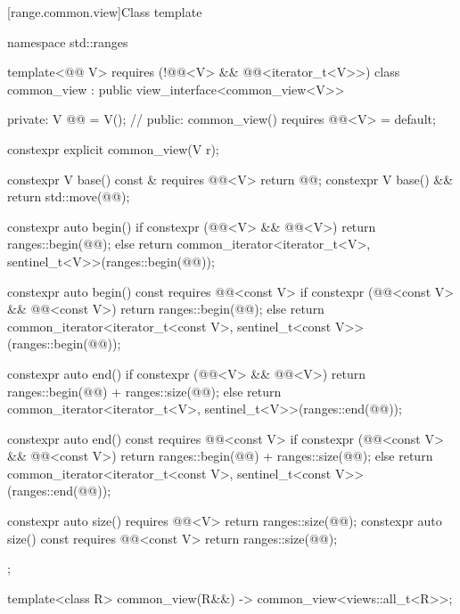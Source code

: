 [range.common.view]{Class template }

%
%
%
%
%
\begin{codeblock}
namespace std::ranges {
  template<@@ V>
    requires (!@@<V> && @@<iterator_t<V>>)
  class common_view : public view_interface<common_view<V>> {
  private:
    V @@ = V();  // \expos
  public:
    common_view() requires @@<V> = default;

    constexpr explicit common_view(V r);

    constexpr V base() const & requires @@<V> { return @@; }
    constexpr V base() && { return std::move(@@); }

    constexpr auto begin() {
      if constexpr (@@<V> && @@<V>)
        return ranges::begin(@@);
      else
        return common_iterator<iterator_t<V>, sentinel_t<V>>(ranges::begin(@@));
    }

    constexpr auto begin() const requires @@<const V> {
      if constexpr (@@<const V> && @@<const V>)
        return ranges::begin(@@);
      else
        return common_iterator<iterator_t<const V>, sentinel_t<const V>>(ranges::begin(@@));
    }

    constexpr auto end() {
      if constexpr (@@<V> && @@<V>)
        return ranges::begin(@@) + ranges::size(@@);
      else
        return common_iterator<iterator_t<V>, sentinel_t<V>>(ranges::end(@@));
    }

    constexpr auto end() const requires @@<const V> {
      if constexpr (@@<const V> && @@<const V>)
        return ranges::begin(@@) + ranges::size(@@);
      else
        return common_iterator<iterator_t<const V>, sentinel_t<const V>>(ranges::end(@@));
    }

    constexpr auto size() requires @@<V> {
      return ranges::size(@@);
    }
    constexpr auto size() const requires @@<const V> {
      return ranges::size(@@);
    }
  };

  template<class R>
    common_view(R&&) -> common_view<views::all_t<R>>;
}
\end{codeblock}


